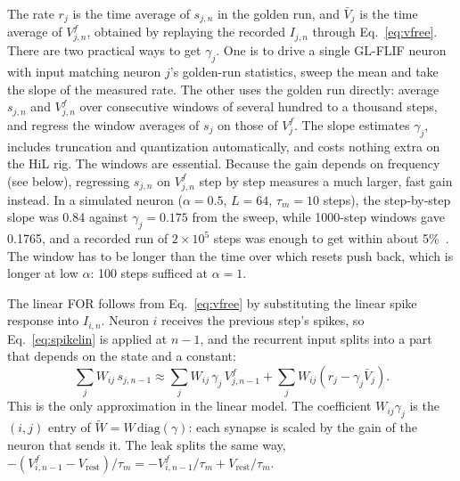 \documentclass[11pt,a4paper]{article}
\newcommand{\Wt}{\tilde W}
\begin{document}
The rate $r_j$ is the time average of $s_{j,n}$ in the golden run, and $\bar V_j$ is the time average of $V^{f}_{j,n}$, obtained by replaying the recorded $I_{j,n}$ through Eq.~\eqref{eq:vfree}. There are two practical ways to get $\gamma_j$. One is to drive a single GL-FLIF neuron with input matching neuron $j$'s golden-run statistics, sweep the mean and take the slope of the measured rate. The other uses the golden run directly: average $s_{j,n}$ and $V^{f}_{j,n}$ over consecutive windows of several hundred to a thousand steps, and regress the window averages of $s_j$ on those of $V^{f}_j$. The slope estimates $\gamma_j$, includes truncation and quantization automatically, and costs nothing extra on the HiL rig. The windows are essential. Because the gain depends on frequency (see below), regressing $s_{j,n}$ on $V^{f}_{j,n}$ step by step measures a much larger, fast gain instead. In a simulated neuron ($\alpha = 0.5$, $L = 64$, $\tau_m = 10$ steps), the step-by-step slope was 0.84 against $\gamma_j = 0.175$ from the sweep, while 1000-step windows gave 0.1765, and a recorded run of $2 \times 10^{5}$ steps was enough to get within about 5\%~\cite{linsupp}. The window has to be longer than the time over which resets push back, which is longer at low $\alpha$: 100 steps sufficed at $\alpha = 1$.

The linear FOR follows from Eq.~\eqref{eq:vfree} by substituting the linear spike response into $I_{i,n}$. Neuron $i$ receives the previous step's spikes, so Eq.~\eqref{eq:spikelin} is applied at $n-1$, and the recurrent input splits into a part that depends on the state and a constant:
\begin{equation*}
\sum_j W_{ij}\, s_{j,n-1} \approx \sum_j W_{ij}\,\gamma_j\, V^{f}_{j,n-1} + \sum_j W_{ij}\left( r_j - \gamma_j \bar V_j \right).
\end{equation*}
This is the only approximation in the linear model. The coefficient $W_{ij}\gamma_j$ is the $(i,j)$ entry of $\Wt = W\,\mathrm{diag}(\gamma)$: each synapse is scaled by the gain of the neuron that sends it. The leak splits the same way, $-(V^{f}_{i,n-1} - V_{\mathrm{rest}})/\tau_m = -V^{f}_{i,n-1}/\tau_m + V_{\mathrm{rest}}/\tau_m$.
\end{document}
